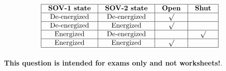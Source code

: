 






$$\vbox{\offinterlineskip
\halign{\strut
\vrule \quad\hfil # \ \hfil & 
\vrule \quad\hfil # \ \hfil & 
\vrule \quad\hfil # \ \hfil & 
\vrule \quad\hfil # \ \hfil \vrule \cr
\noalign{\hrule}
%
{\bf SOV-1 state} & {\bf SOV-2 state} & {\bf Open} & {\bf Shut} \cr
%
\noalign{\hrule}
%
De-energized & De-energized & $\surd$ &  \cr
%
\noalign{\hrule}
%
De-energized & Energized & $\surd$ &  \cr
%
\noalign{\hrule}
%
Energized & De-energized &  & $\surd$ \cr
%
\noalign{\hrule}
%
Energized & Energized & $\surd$ &  \cr
%
\noalign{\hrule}
} %
}$$ %







{\bf This question is intended for exams only and not worksheets!}.


